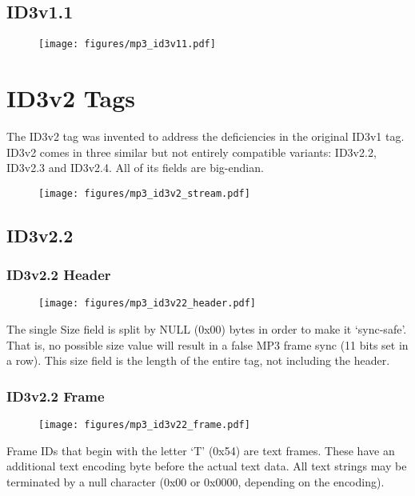 \subsection{ID3v1.1}

\begin{figure}[h]
\texttt{[image: figures/mp3\_id3v11.pdf]}
\end{figure}

\section{ID3v2 Tags}

The ID3v2 tag was invented to address the deficiencies in the original
ID3v1 tag.
ID3v2 comes in three similar but not entirely compatible variants:
ID3v2.2, ID3v2.3 and ID3v2.4.
All of its fields are big-endian.

\begin{figure}[h]
\texttt{[image: figures/mp3\_id3v2\_stream.pdf]}
\end{figure}

\subsection{ID3v2.2}

\subsubsection{ID3v2.2 Header}

\begin{figure}[h]
\texttt{[image: figures/mp3\_id3v22\_header.pdf]}
\end{figure}
\par
\noindent
The single Size field is split by NULL (0x00) bytes in order to make
it `sync-safe'.
That is, no possible size value will result in a false
MP3 frame sync (11 bits set in a row).
This size field is the length of the entire tag, not including the header.

\subsubsection{ID3v2.2 Frame}

\begin{figure}[h]
\texttt{[image: figures/mp3\_id3v22\_frame.pdf]}
\end{figure}
\par
\noindent
Frame IDs that begin with the letter `T' (0x54) are text frames.
These have an additional text encoding byte before the actual
text data.
All text strings may be terminated by a null character
(0x00 or 0x0000, depending on the encoding).

